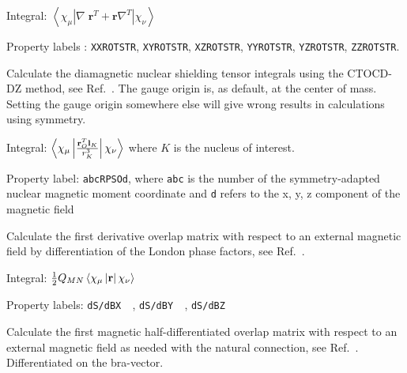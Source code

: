 \begin{description}
\begin{list}{}{}
\item Integral: $\left<\chi_{\mu}\left|\nabla\;{\mathbf r}^T +
{\mathbf r}\nabla^T\right|\chi_{\nu}\right>$
\item Property labels : \verb|XXROTSTR|, \verb|XYROTSTR|, \verb|XZROTSTR|, \verb|YYROTSTR|, \verb|YZROTSTR|, \verb|ZZROTSTR|.
\end{list}

\item[\Key{RPSO}] Calculate the diamagnetic nuclear shielding tensor 
integrals using the CTOCD-DZ method,
see Ref.~\cite{paololazz1,paololazz2,ctocd}. 
The gauge origin is, as default, at the center of mass. 
Setting the gauge origin somewhere else will give wrong results in calculations using symmetry.

\begin{list}{}{}
\item Integral:
$\left<\chi_{\mu}\left|\frac{{\bf r}_O^T{\bf l}_K}{r_{K}^{3}}\right|\chi_{\nu}\right>$
where $K$ is the nucleus of interest.
\item Property label: \verb|abcRPSOd|, where \verb|abc| is the number
of the symmetry-adapted nuclear magnetic moment coordinate and \verb|d| refers to the
x, y, z component of the magnetic field
\end{list}


\item[\Key{S1MAG}] Calculate the first derivative overlap
matrix with respect to an
external magnetic field by differentiation
of the London phase factors, see Ref.~\cite{thpjjcp95}.

\begin{list}{}{}
\item Integral: $\frac{1}{2}Q_{MN}\left<\chi_{\mu}\left|{\bf
r}\right|\chi_{\nu}\right>$
\item Property labels: \verb|dS/dBX  |, \verb|dS/dBY  |,
\verb|dS/dBZ  |
\end{list}

\item[\Key{S1MAGL}] Calculate the first magnetic half-differentiated overlap
matrix with respect to an
external magnetic field as needed with the
natural connection, see
Ref.~\cite{krthklbpjjocp195}. Differentiated
on the bra-vector.



\end{description}
